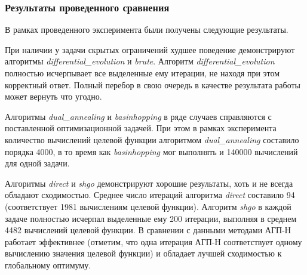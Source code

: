 \documentclass[a4paper,12pt,russian]{article}
\begin{document}
\subsubsection{Результаты проведенного сравнения}

В рамках проведенного эксперимента были получены следующие результаты.

При наличии у задачи скрытых ограничений худшее поведение демонстрируют алгоритмы \textit{differential\_evolution} и \textit{brute}. Алгоритм \textit{differential\_evolution} полностью исчерпывает все выделенные ему итерации, не находя при этом корректный ответ. Полный перебор в свою очередь в качестве результата работы может вернуть что угодно. 

Алгоритмы \textit{dual\_annealing} и \textit{basinhopping} в ряде случаев справляются с поставленной оптимизационной задачей. При этом в рамках эксперимента количество вычислений целевой функции алгоритмом \textit{dual\_annealing} составило порядка 4000, в то время как \textit{basinhopping} мог выполнять и 140000 вычислений для одной задачи.

Алгоритмы \textit{direct} и \textit{shgo} демонстрируют хорошие результаты, хоть и не всегда обладают сходимостью. Среднее число итераций алгоритма \textit{direct} составило 94 (соответствует 1981 вычислениям целевой функции). Алгоритм \textit{shgo} в каждой задаче полностью исчерпал выделенные ему 200 итерации, выполняя в среднем 4482 вычислений целевой функции. В сравнении с данными методами АГП-Н работает эффективнее (отметим, что одна итерация АГП-Н соответствует одному вычислению значения целевой функции) и обладает лучшей сходимостью к глобальному оптимуму.
\end{document}
